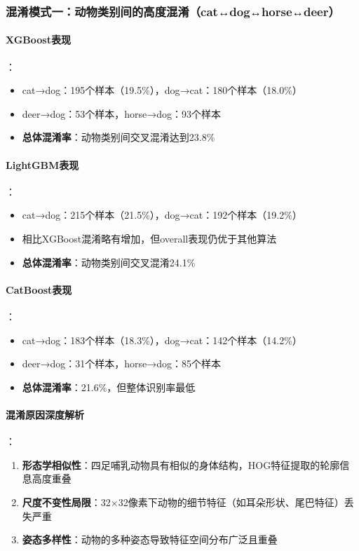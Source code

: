 \documentclass[UTF8]{report}
\theoremstyle{MyLineTheoremStyle} %
\theoremstyle{MyBlockTheoremStyle} %
\theoremstyle{MySubsubsectionStyle} %
\begin{document}
\subsubsection{混淆模式一：动物类别间的高度混淆（cat↔dog↔horse↔deer）}
\paragraph{XGBoost表现}：
\begin{itemize}
    \item cat→dog：195个样本（19.5\%），dog→cat：180个样本（18.0\%）
    \item deer→dog：53个样本，horse→dog：93个样本
    \item \textbf{总体混淆率}：动物类别间交叉混淆达到23.8\%
\end{itemize}
\paragraph{LightGBM表现}：
\begin{itemize}
    \item cat→dog：215个样本（21.5\%），dog→cat：192个样本（19.2\%）
    \item 相比XGBoost混淆略有增加，但overall表现仍优于其他算法
    \item \textbf{总体混淆率}：动物类别间交叉混淆24.1\%
\end{itemize}
\paragraph{CatBoost表现}：
\begin{itemize}
    \item cat→dog：183个样本（18.3\%），dog→cat：142个样本（14.2\%）
    \item deer→dog：31个样本，horse→dog：85个样本
    \item \textbf{总体混淆率}：21.6\%，但整体识别率最低
\end{itemize}
\paragraph{混淆原因深度解析}：
\begin{enumerate}
    \item \textbf{形态学相似性}：四足哺乳动物具有相似的身体结构，HOG特征提取的轮廓信息高度重叠
    \item \textbf{尺度不变性局限}：32×32像素下动物的细节特征（如耳朵形状、尾巴特征）丢失严重
    \item \textbf{姿态多样性}：动物的多种姿态导致特征空间分布广泛且重叠
\end{enumerate}
\end{document}
